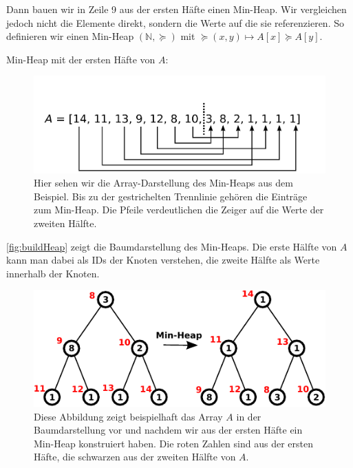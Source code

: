 \documentclass[a4paper,11pt]{scrartcl}%
\theoremstyle{change}
\theoremstyle{nonumberplain}
\theoremstyle{change}
\theoremstyle{nonumberplain}
\theoremstyle{change}
\theoremstyle{nonumberplain}
\begin{document}
Dann bauen wir in Zeile 9 aus der ersten Häfte einen Min-Heap. Wir vergleichen jedoch nicht die Elemente direkt, sondern die Werte auf die sie referenzieren. So definieren wir einen Min-Heap $(\mathbb{N}, \succeq)$ mit $\succeq(x,y) \mapsto A[x] \succeq A[y]$.

Min-Heap mit der ersten Häfte von $A$:

\begin{figure}
	\begin{center}
		\includegraphics[scale=0.3]{./pics/A_heap}
		\caption{Hier sehen wir die Array-Darstellung des Min-Heaps aus dem Beispiel. Bis zu der gestrichelten Trennlinie gehören die Einträge zum Min-Heap. Die Pfeile verdeutlichen die Zeiger auf die Werte der zweiten Hälfte.}
		\label{A_heap}
	\end{center}
\end{figure}
\newpage
\autoref{fig:buildHeap} zeigt die Baumdarstellung des Min-Heaps. Die erste Hälfte von $A$ kann man dabei als IDs der Knoten verstehen, die zweite Hälfte als Werte innerhalb der Knoten.\cite[S. 342]{managingGigabytes}

\begin{figure}[h]
\centering
	  \includegraphics[scale=0.9]{./pics/build-Heap}
	  \caption{Diese Abbildung zeigt beispielhaft das Array $A$ in der Baumdarstellung vor und nachdem wir aus der ersten Häfte ein Min-Heap konstruiert haben. Die roten Zahlen sind aus der ersten Häfte, die schwarzen aus der zweiten Hälfte von $A$.}
	  \label{fig:buildHeap}
\end{figure}
\end{document}
